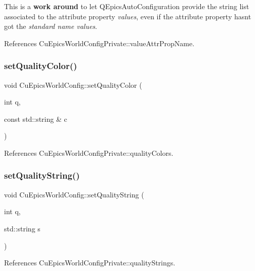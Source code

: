 This is a {\bfseries work around} to let Q\+Epics\+Auto\+Configuration provide the string list associated to the attribute property {\itshape values}, even if the attribute property hasn\textquotesingle{}t got the {\itshape standard name {\itshape values}}. 

References Cu\+Epics\+World\+Config\+Private\+::value\+Attr\+Prop\+Name.

\mbox{\label{classCuEpicsWorldConfig_a968e62eb41e16fb46bf53938ee6716f4}} 
\subsubsection{set\+Quality\+Color()}
{\footnotesize\ttfamily void Cu\+Epics\+World\+Config\+::set\+Quality\+Color (\begin{DoxyParamCaption}\item[{int}]{q,  }\item[{const std\+::string \&}]{c }\end{DoxyParamCaption})}



References Cu\+Epics\+World\+Config\+Private\+::quality\+Colors.

\mbox{\label{classCuEpicsWorldConfig_a3b7520bba46486d562d6d2660d4c22fe}} 
\subsubsection{set\+Quality\+String()}
{\footnotesize\ttfamily void Cu\+Epics\+World\+Config\+::set\+Quality\+String (\begin{DoxyParamCaption}\item[{int}]{q,  }\item[{std\+::string}]{s }\end{DoxyParamCaption})}



References Cu\+Epics\+World\+Config\+Private\+::quality\+Strings.

\mbox{\label{classCuEpicsWorldConfig_a35813a91365d8094c7508340a821289c}} 

